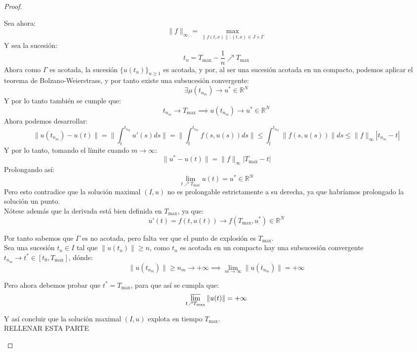 \begin{proof}
\begin{enumerate}
        Sea ahora:
        \[
            \| f \|_\infty = \max_{\| f(t, x) \| : (t, x) \in J \times \overline{\Gamma}}
        \]
        Y sea la sucesión:
        \[
            t_n = T_{\text{max}} - \frac{1}{n} \nearrow T_{\text{max}}
        \]
        Ahora como $\Gamma$ es acotada, la sucesión $\{ u(t_n) \}_{n \geq 1}$ es acotada, y por, al ser una sucesión acotada en un compacto, podemos aplicar el teorema de Bolzano-Weierstrass, y por tanto existe una subsucesión convergente:
        \[
            \exists \mu(t_{n_m}) \to u^* \in \mathbb{R}^N
        \]
        Y por lo tanto también se cumple que:
        \[
            t_{n_m} \to T_{\text{max}} \implies
            u(t_{n_m}) \to u^* \in \mathbb{R}^N
        \]
        Ahora podemos desarrollar:
        \[
            \| u(t_{n_m}) - u(t) \| =
            \| \int_t^{t_{n_m}} u'(s) ds \| =
            \| \int_t^{t_{n_m}} f(s, u(s)) ds \| \leq
            \int_t^{t_{n_m}} \| f(s, u(s)) \| ds \leq
            \| f \|_\infty | t_{n_m} - t |
        \]
        Y por lo tanto, tomando el límite cuando $m \to \infty$:
        \[
            \| u^* - u(t) \| = \| f \|_\infty | T_{\text{max}} - t | 
        \]
        Prolongando así:
        \[
            \boxed{\lim_{t \nearrow T_{\text{max}}} u(t) = u^* \in \mathbb{R}^N}
        \]
        Pero esto contradice que la solución maximal $(I, u)$ no es prolongable estrictamente a su derecha, ya que habríamos prolongado la solución un punto.\\

        Nótese además que la derivada está bien definida en $T_{\text{max}}$, ya que:
        \[
            u'(t) = f(t, u(t)) \to f(T_{\text{max}}, u^*) \in \mathbb{R}^N
        \]

        Por tanto sabemos que $\Gamma$ es no acotada, pero falta ver que el punto de explosión es $T_{\text{max}}$.\\

        Sea una sucesión $t_n \in I$ tal que $\| u(t_n) \| \geq n$, como $t_n$ es acotada en un compacto hay una subsucesión convergente $t_{n_m} \to t^* \in [t_0, T_{\text{max}}]$, dónde:
        \[
            \| u(t_{n_m}) \| \geq n_m \to +\infty \implies
            \lim_{m \to \infty} \| u(t_{n_m}) \| = +\infty
        \]

        Pero ahora debemos probar que $t^* = T_{\text{max}}$, para que así se cumpla que:
        \[
            \varlimsup_{t \nearrow T_{\text{max}}} \| u(t) \| = +\infty
        \]
        
        Y así concluir que la solución maximal $(I, u)$ explota en tiempo $T_{\text{max}}$.\\
        RELLENAR ESTA PARTE
    \end{enumerate}
\end{proof}

